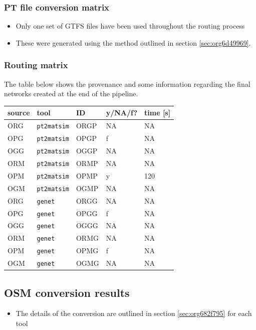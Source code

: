 \documentclass[11pt]{article}
\begin{document}
\subsubsection{PT file conversion matrix}
\label{sec:org60dd26d}
\begin{itemize}
\item Only one set of GTFS files have been used throughout the routing process
\item These were generated using the method outlined in section \ref{sec:org6d49969}.
\end{itemize}
\subsubsection{Routing matrix}
\label{sec:org6fff08f}
The table below shows the provenance and some information regarding the final networks created at the end of the pipeline.

\begin{center}
\begin{tabular}{lllll}
source & tool & ID & y/NA/f? & time [s]\\
\hline
ORG & \texttt{pt2matsim} & ORGP & NA & NA\\
OPG & \texttt{pt2matsim} & OPGP & f & NA\\
OGG & \texttt{pt2matsim} & OGGP & NA & NA\\
ORM & \texttt{pt2matsim} & ORMP & NA & NA\\
OPM & \texttt{pt2matsim} & OPMP & y & 120\\
OGM & \texttt{pt2matsim} & OGMP & NA & NA\\
ORG & \texttt{genet} & ORGG & NA & NA\\
OPG & \texttt{genet} & OPGG & f & NA\\
OGG & \texttt{genet} & OGGG & NA & NA\\
ORM & \texttt{genet} & ORMG & NA & NA\\
OPM & \texttt{genet} & OPMG & f & NA\\
OGM & \texttt{genet} & OGMG & NA & NA\\
\end{tabular}
\end{center}

\subsection{OSM conversion results}
\label{sec:orga5bd4bf}
\begin{itemize}
\item The details of the conversion are outlined in section \ref{sec:org682f795} for each tool
\end{itemize}
\end{document}
